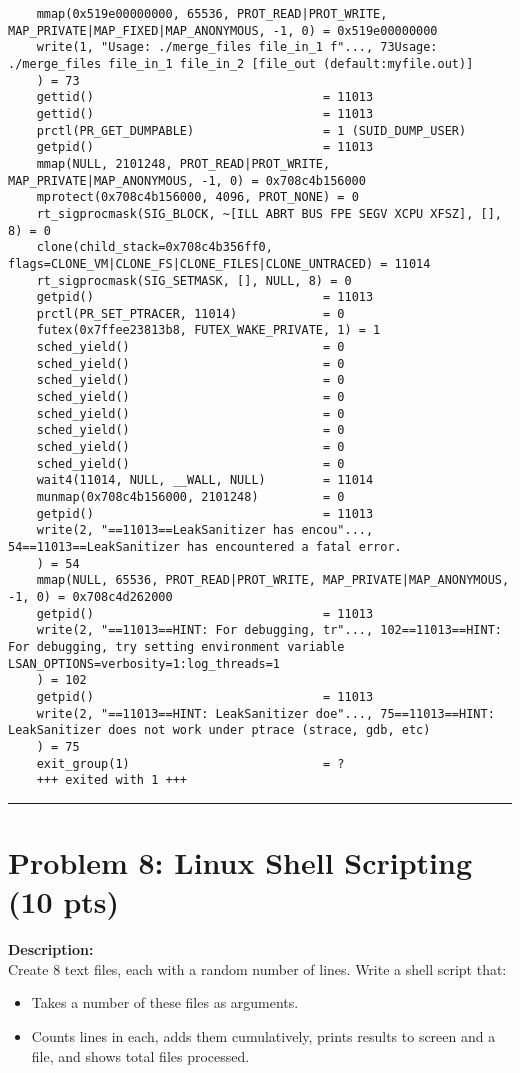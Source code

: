 \documentclass[12pt]{article}
\begin{document}
\begin{verbatim}
	mmap(0x519e00000000, 65536, PROT_READ|PROT_WRITE, MAP_PRIVATE|MAP_FIXED|MAP_ANONYMOUS, -1, 0) = 0x519e00000000
	write(1, "Usage: ./merge_files file_in_1 f"..., 73Usage: ./merge_files file_in_1 file_in_2 [file_out (default:myfile.out)]
	) = 73
	gettid()                                = 11013
	gettid()                                = 11013
	prctl(PR_GET_DUMPABLE)                  = 1 (SUID_DUMP_USER)
	getpid()                                = 11013
	mmap(NULL, 2101248, PROT_READ|PROT_WRITE, MAP_PRIVATE|MAP_ANONYMOUS, -1, 0) = 0x708c4b156000
	mprotect(0x708c4b156000, 4096, PROT_NONE) = 0
	rt_sigprocmask(SIG_BLOCK, ~[ILL ABRT BUS FPE SEGV XCPU XFSZ], [], 8) = 0
	clone(child_stack=0x708c4b356ff0, flags=CLONE_VM|CLONE_FS|CLONE_FILES|CLONE_UNTRACED) = 11014
	rt_sigprocmask(SIG_SETMASK, [], NULL, 8) = 0
	getpid()                                = 11013
	prctl(PR_SET_PTRACER, 11014)            = 0
	futex(0x7ffee23813b8, FUTEX_WAKE_PRIVATE, 1) = 1
	sched_yield()                           = 0
	sched_yield()                           = 0
	sched_yield()                           = 0
	sched_yield()                           = 0
	sched_yield()                           = 0
	sched_yield()                           = 0
	sched_yield()                           = 0
	sched_yield()                           = 0
	wait4(11014, NULL, __WALL, NULL)        = 11014
	munmap(0x708c4b156000, 2101248)         = 0
	getpid()                                = 11013
	write(2, "==11013==LeakSanitizer has encou"..., 54==11013==LeakSanitizer has encountered a fatal error.
	) = 54
	mmap(NULL, 65536, PROT_READ|PROT_WRITE, MAP_PRIVATE|MAP_ANONYMOUS, -1, 0) = 0x708c4d262000
	getpid()                                = 11013
	write(2, "==11013==HINT: For debugging, tr"..., 102==11013==HINT: For debugging, try setting environment variable LSAN_OPTIONS=verbosity=1:log_threads=1
	) = 102
	getpid()                                = 11013
	write(2, "==11013==HINT: LeakSanitizer doe"..., 75==11013==HINT: LeakSanitizer does not work under ptrace (strace, gdb, etc)
	) = 75
	exit_group(1)                           = ?
	+++ exited with 1 +++
	\end{verbatim}
	
	\hrule
	\vspace{0.5cm}
	
	\section{Problem 8: Linux Shell Scripting (10 pts)}
	\textbf{Description:} \\
	Create 8 text files, each with a random number of lines. Write a shell script that:
	\begin{itemize}
		\item Takes a number of these files as arguments.
		\item Counts lines in each, adds them cumulatively, prints results to screen and a file, and shows total files processed.
	\end{itemize}
	
\end{document}
